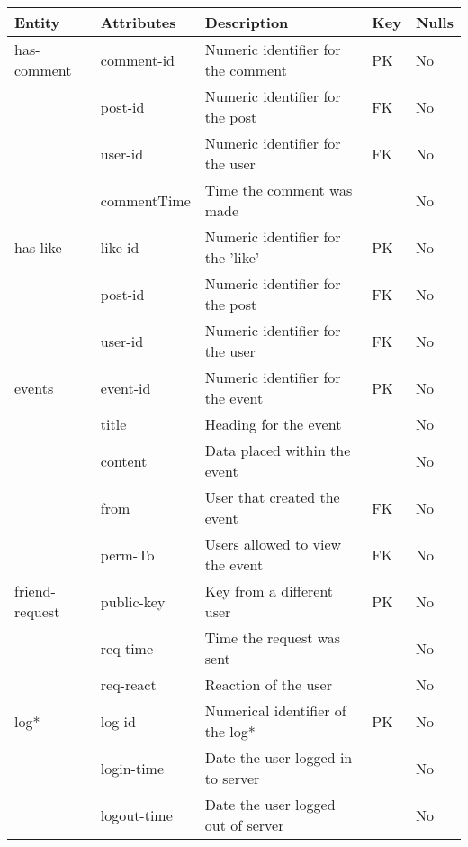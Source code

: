 \begin{tabular}{lllll}

\toprule
    
    Entity & Attributes & Description & Key & Nulls \\

\midrule

    has-comment & comment-id  & Numeric identifier for the comment & PK & No  \\
                & post-id     & Numeric identifier for the post    & FK & No  \\
                & user-id     & Numeric identifier for the user    & FK & No  \\
                & commentTime & Time the comment was made          &    & No  \\

\midrule

       has-like & like-id     & Numeric identifier for the 'like'  & PK & No  \\
                & post-id     & Numeric identifier for the post    & FK & No  \\
                & user-id     & Numeric identifier for the user    & FK & No  \\
                
\midrule

         events & event-id    & Numeric identifier for the event   & PK & No  \\
                & title       & Heading for the event              &    & No  \\
                & content     & Data placed within the event       &    & No  \\
                & from        & User that created the event        & FK & No  \\
                & perm-To     & Users allowed to view the event    & FK & No  \\
                
\midrule

 friend-request & public-key  & Key from a different user          & PK & No  \\
                & req-time    & Time the request was sent          &    & No  \\
                & req-react   & Reaction of the user               &    & No  \\
                
\midrule

           log* & log-id      & Numerical identifier of the log*   & PK & No  \\
                & login-time  & Date the user logged in to server  &    & No  \\
                & logout-time & Date the user logged out of server &    & No  \\
                
\bottomrule

\end{tabular}